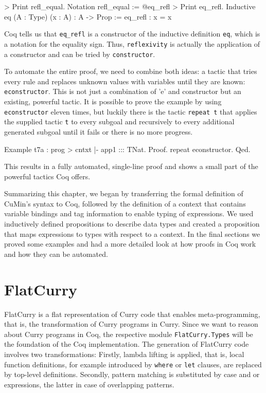 \documentclass[paper = a4, fleqn, abstract=on, twoside]{scrreprt}
\newcommand{\todo}[1]{\marginpar{\textbf{TODO:} #1}}
\newcommand{\coqinline}[1]{\texttt{#1}}
\begin{document}
\begin{coqcode}
> Print refl_equal.
Notation refl_equal := @eq_refl
> Print eq_refl.
Inductive eq (A : Type) (x : A) : A -> Prop :=  eq_refl : x = x
\end{coqcode}
Coq tells us that \texttt{eq\_refl} is a constructor of the inductive definition \texttt{eq}, which is a notation for the equality sign. Thus, \texttt{reflexivity} is actually the application of a constructor and can be tried by \texttt{constructor}.\\ 
\par \noindent
To automate the entire proof, we need to combine both ideas: a tactic that tries every rule and replaces unknown values with variables until they are known: \coqinline{econstructor}. This is not just a combination of 'e' and constructor but an existing, powerful tactic. It is possible to prove the example by using \coqinline{econstructor} eleven times, but luckily there is the tactic \coqinline{repeat t} that applies the supplied tactic \coqinline{t} to every subgoal and recursively to every additional generated subgoal until it fails or there is no more progress.
\begin{coqcode}
Example t7a : prog > cntxt |- app1 ::: TNat.
Proof.
  repeat econstructor.
Qed.
\end{coqcode}
This results in a fully automated, single-line proof and shows a small part of the powerful tactics Coq offers.\\
\par \noindent
Summarizing this chapter, we began by transferring the formal definition of CuMin's syntax to Coq, followed by the definition of a context that contains variable bindings and tag information to enable typing of expressions. We used inductively defined propositions to describe data types and created a proposition that maps expressions to types with respect to a context. In the final sections we proved some examples and had a more detailed look at how proofs in Coq work and how they can be automated.
\chapter{FlatCurry}
\label{flatcurry}
\todo{> Bei Ergebnissen}
FlatCurry is a flat representation of Curry code that enables meta-programming, that is, the transformation of Curry programs in Curry.\cite{kics2manual} Since we want to reason about Curry programs in Coq, the respective module \texttt{FlatCurry.Types} will be the foundation of the Coq implementation. The generation of FlatCurry code involves two transformations: Firstly, lambda lifting is applied, that is, local function definitions, for example introduced by \texttt{where} or \texttt{let} clauses, are replaced by top-level definitions. Secondly, pattern matching is substituted by case and or expressions, the latter in case of overlapping patterns.
\par
\todo{Kapitelüberblick}
\end{document}
